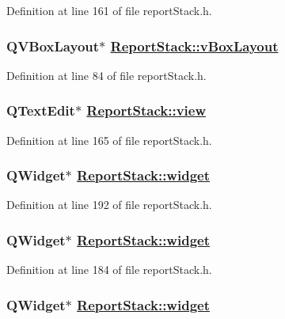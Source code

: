 Definition at line 161 of file report\-Stack.h.\hypertarget{classReportStack_r13}{
\subsubsection[vBoxLayout]{\setlength{\rightskip}{0pt plus 5cm}QVBox\-Layout$\ast$ \hyperlink{classReportStack_r13}{Report\-Stack::v\-Box\-Layout}}}
\label{classReportStack_r13}


Definition at line 84 of file report\-Stack.h.\hypertarget{classReportStack_r85}{
\subsubsection[view]{\setlength{\rightskip}{0pt plus 5cm}QText\-Edit$\ast$ \hyperlink{classReportStack_r85}{Report\-Stack::view}}}
\label{classReportStack_r85}


Definition at line 165 of file report\-Stack.h.\hypertarget{classReportStack_r106}{
\subsubsection[widget]{\setlength{\rightskip}{0pt plus 5cm}QWidget$\ast$ \hyperlink{classReportStack_r8}{Report\-Stack::widget}}}
\label{classReportStack_r106}


Definition at line 192 of file report\-Stack.h.\hypertarget{classReportStack_r100}{
\subsubsection[widget]{\setlength{\rightskip}{0pt plus 5cm}QWidget$\ast$ \hyperlink{classReportStack_r8}{Report\-Stack::widget}}}
\label{classReportStack_r100}


Definition at line 184 of file report\-Stack.h.\hypertarget{classReportStack_r94}{
\subsubsection[widget]{\setlength{\rightskip}{0pt plus 5cm}QWidget$\ast$ \hyperlink{classReportStack_r8}{Report\-Stack::widget}}}
\label{classReportStack_r94}


